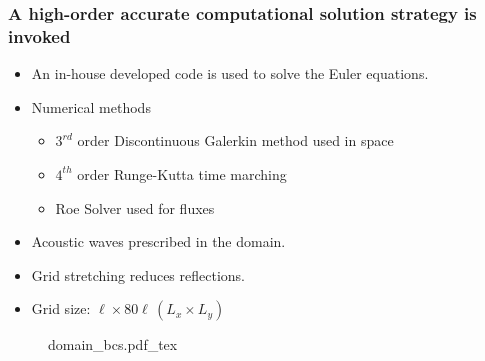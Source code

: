 \begin{frame} \frametitle{A high-order accurate computational solution strategy is invoked}
  {\small
    \begin{minipage}{0.62\textwidth}
      \begin{itemize}
        \setlength\itemsep{1em}
      \item An in-house developed code is used to solve the Euler equations.
      \item Numerical methods {\scriptsize \citep{HenrydeFrahan2015}}
        \begin{itemize}
        \item $3^{rd}$ order Discontinuous Galerkin method used in space
        \item $4^{th}$ order Runge-Kutta time marching
        \item Roe Solver used for fluxes
        \end{itemize}
      \item Acoustic waves prescribed in the domain.
      \item Grid stretching reduces reflections.
      \item Grid size: $\ell \times 80\ell \, (L_x \times L_y)$
      \end{itemize}
    \end{minipage}
    \hfill%
    \begin{minipage}{0.34\textwidth}
      \begin{figure}
        \centering
        \def\svgwidth{\textwidth}
        {\footnotesize
          {domain_bcs.pdf_tex}%
        }
      \end{figure}
    \end{minipage}
  }
\end{frame}
